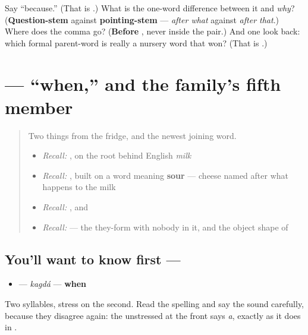 \begin{tcolorbox}[breakable,colback=teal!4,colframe=teal!35!black,title={Before you move on}]
Say \textquotedblleft{}because.\textquotedblright{} (That is \textbf{ }.) What is the one-word difference between it and \emph{why}? (\textbf{Question-stem} against \textbf{pointing-stem} — \emph{after what} against \emph{after that}.) Where does the comma go? (\textbf{Before }, never inside the pair.) And one look back: which formal parent-word is really a nursery word that won? (That is \textbf{}.)
\end{tcolorbox}
\section[\texorpdfstring{\ru{когда} (kagdá)}{когда (kagdá)}]{ — \textquotedblleft{}when,\textquotedblright{} and the family's fifth member}

\label{lesson:RU-C19-kogda-vopros}



\begin{quote}
Two things from the fridge, and the newest joining word.

\begin{itemize}
\raggedright
  \item \emph{Recall:} \emph{}, on the root behind English \emph{milk}
  \item \emph{Recall:} \emph{}, built on a word meaning \textbf{sour} — cheese named after what happens to the milk
  \item \emph{Recall:} \emph{ }, and \emph{}
  \item \emph{Recall:} \emph{ } — the they-form with nobody in it, and the object shape of \emph{}
\end{itemize}
\end{quote}

\subsection*{You'll want to know first — }
\begin{itemize}
\raggedright
  \item \textbf{} — \emph{kagdá} — \textbf{when}
\end{itemize}

Two syllables, stress on the second. Read the spelling and say the sound carefully, because they disagree again: the unstressed \textbf{} at the front says \emph{a}, exactly as it does in \textbf{}.

